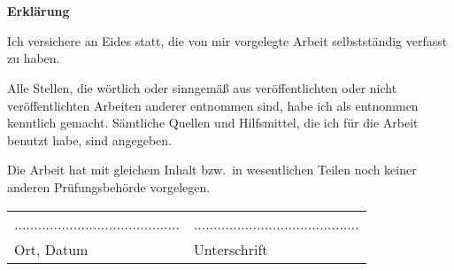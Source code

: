 \chapter*{}\label{ch:erklaerung}
\begin{center}
    \large \textbf{Erklärung}
\end{center}
Ich versichere an Eides statt, die von mir vorgelegte Arbeit selbstständig verfasst zu haben.

Alle Stellen, die wörtlich oder sinngemäß aus veröffentlichten oder nicht veröffentlichten Arbeiten anderer entnommen sind, habe ich als entnommen kenntlich gemacht.
Sämtliche Quellen und Hilfsmittel, die ich für die Arbeit benutzt habe, sind angegeben.

Die Arbeit hat mit gleichem Inhalt bzw.~in wesentlichen Teilen noch keiner anderen Prüfungsbehörde vorgelegen.

\vspace{2\baselineskip}

\begin{tabular}{ll}
    .......................................... & .......................................... \\
    Ort, Datum                                 & Unterschrift
\end{tabular}
